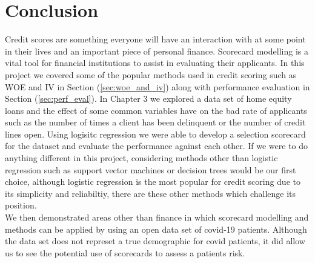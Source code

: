 \chapter{Conclusion} \label{cha:chapter-6}

Credit scores are something everyone will have an interaction with at some point in their lives and an important piece of personal finance. Scorecard modelling is a vital tool for financial institutions to assist in evaluating their applicants. In this project we covered some of the popular methods used in credit scoring such as WOE and IV in Section (\ref{sec:woe_and_iv}) along with performance evaluation in Section (\ref{sec:perf_eval}). In Chapter 3 we explored a data set of home equity loans and the effect of some common variables have on the bad rate of applicants such as the number of times a client has been delinquent or the number of credit lines open. Using logisitc regression we were able to develop a selection scorecard for the dataset and evaluate the performance against each other. If we were to do anything different in this project, considering methods other than logistic regression such as support vector machines or decision trees would be our first choice, although logistic regression is the most popular for credit scoring due to its simplicity and reliabiltiy, there are these other methods which challenge its position. \\

We then demonstrated areas other than finance in which scorecard modelling and methods can be applied by using an open data set of covid-19 patients. Although the data set does not represet a true demographic for covid patients, it did allow us to see the potential use of scorecards to assess a patients risk. 